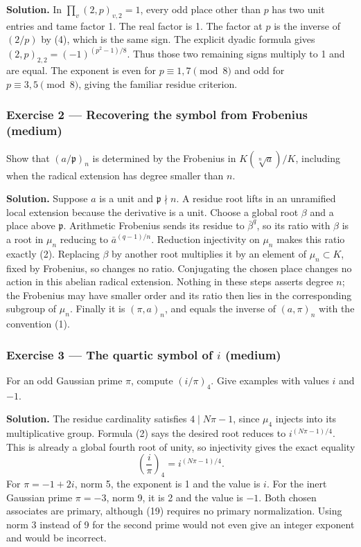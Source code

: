 \documentclass[11pt,a4paper]{article}
\begin{document}
\textbf{Solution.} In \(\prod_v(2,p)_{v,2}=1\), every odd place other
than \(p\) has two unit entries and tame factor 1. The real factor is 1.
The factor at \(p\) is the inverse of \((2/p)\) by (4), which is the
same sign. The explicit dyadic formula gives
\((2,p)_{2,2}=(-1)^{(p^2-1)/8}\). Thus those two remaining signs
multiply to 1 and are equal. The exponent is even for
\(p\equiv1,7\pmod8\) and odd for \(p\equiv3,5\pmod8\), giving the
familiar residue criterion.

\subsubsection{Exercise 2 --- Recovering the symbol from Frobenius
(medium)}\label{exercise-2-recovering-the-symbol-from-frobenius-medium}

Show that \((a/\mathfrak p)_n\) is determined by the Frobenius in
\(K(\sqrt[n]a)/K\), including when the radical extension has degree
smaller than \(n\).

\textbf{Solution.} Suppose \(a\) is a unit and \(\mathfrak p\nmid n\). A
residue root lifts in an unramified local extension because the
derivative is a unit. Choose a global root \(\beta\) and a place above
\(\mathfrak p\). Arithmetic Frobenius sends its residue to
\(\bar\beta^q\), so its ratio with \(\beta\) is a root in \(\mu_n\)
reducing to \(\bar a^{(q-1)/n}\). Reduction injectivity on \(\mu_n\)
makes this ratio exactly (2). Replacing \(\beta\) by another root
multiplies it by an element of \(\mu_n\subset K\), fixed by Frobenius,
so changes no ratio. Conjugating the chosen place changes no action in
this abelian radical extension. Nothing in these steps asserts degree
\(n\); the Frobenius may have smaller order and its ratio then lies in
the corresponding subgroup of \(\mu_n\). Finally it is \((\pi,a)_n\),
and equals the inverse of \((a,\pi)_n\) with the convention (1).

\subsubsection{\texorpdfstring{Exercise 3 --- The quartic symbol of
\(i\)
(medium)}{Exercise 3 --- The quartic symbol of i (medium)}}\label{exercise-3-the-quartic-symbol-of-i-medium}

For an odd Gaussian prime \(\pi\), compute \((i/\pi)_4\). Give examples
with values \(i\) and \(-1\).

\textbf{Solution.} The residue cardinality satisfies \(4\mid N\pi-1\),
since \(\mu_4\) injects into its multiplicative group. Formula (2) says
the desired root reduces to \(i^{(N\pi-1)/4}\). This is already a global
fourth root of unity, so injectivity gives the exact equality \[
\left(\frac i\pi\right)_4=i^{(N\pi-1)/4}.
\tag{19}
\] For \(\pi=-1+2i\), norm 5, the exponent is 1 and the value is \(i\).
For the inert Gaussian prime \(\pi=-3\), norm 9, it is 2 and the value
is \(-1\). Both chosen associates are primary, although (19) requires no
primary normalization. Using norm 3 instead of 9 for the second prime
would not even give an integer exponent and would be incorrect.
\end{document}

